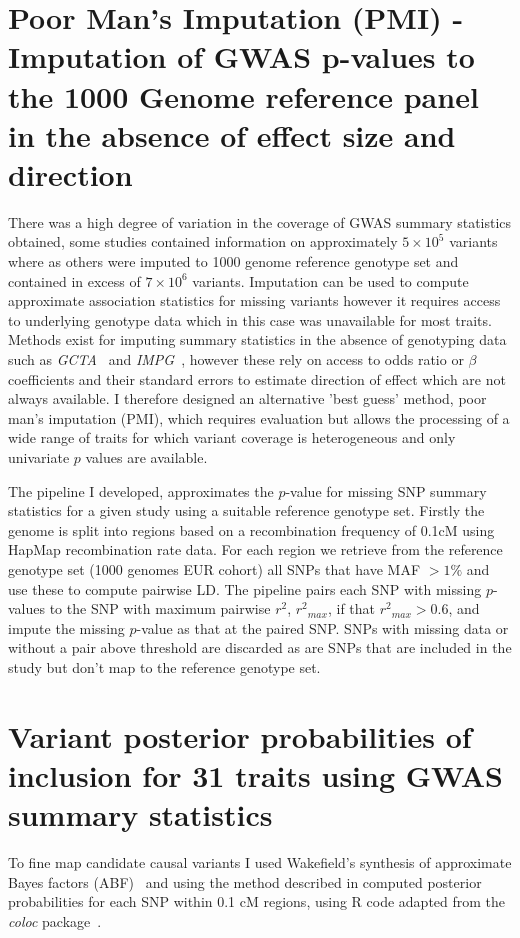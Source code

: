 \documentclass[a4paper,11pt]{report}
\begin{document}
\section{Poor Man's Imputation (PMI) - Imputation of GWAS p-values to the 1000 Genome reference panel in the absence of effect size and direction}
There was a high degree of variation in the coverage of GWAS summary statistics obtained, some studies contained information on approximately $5 \times 10^5$ variants where as others were imputed to 1000 genome reference genotype set and contained in excess of $7 \times 10^6$ variants. Imputation can be used to compute approximate association statistics for missing variants however it requires access to underlying genotype data which in this case was unavailable for most traits. Methods exist for imputing summary statistics in the absence of genotyping data such as \textit{GCTA}~\citep{YangLeeGoddardEtAl2011} and \textit{IMPG}~\citep{Pasaniuc2014-im}, however these rely on access to odds ratio or $\beta$ coefficients and their standard errors to estimate direction of effect which are not always available. I therefore designed an alternative 'best guess' method, poor man's imputation (PMI), which requires evaluation but allows the processing of a wide range of traits for which variant coverage is heterogeneous and only univariate $p$ values are available.

The pipeline I developed, approximates the $p$-value for missing SNP summary statistics for a given study using a suitable reference genotype set. Firstly the genome is split into regions based on a recombination frequency of 0.1cM using HapMap recombination rate data. For each region we retrieve from the reference genotype set (1000 genomes EUR cohort) all SNPs that have MAF $ > 1\%$ and use these to compute pairwise LD. The pipeline pairs each SNP with missing $p$-values to the SNP with maximum pairwise $r^2$, ${r^2}_{max}$, if that ${r^2}_{max} > 0.6$, and impute the missing $p$-value as that at the paired SNP. SNPs with missing data or without a pair above threshold are discarded as are SNPs that are included in the study but don’t map to the reference genotype set. 

\section{Variant posterior probabilities of inclusion for 31 traits using GWAS summary statistics}
To fine map candidate causal variants I used Wakefield’s synthesis of approximate Bayes factors (ABF)~\citep{Wakefield2009} and using the method described in \citet{The_Wellcome_Trust_Case_Control_Consortium2012-ad} computed posterior probabilities for each SNP within 0.1 cM regions, using R code adapted from the \textit{coloc} package~\citep{GiambartolomeiVukcevicSchadtEtAl2014}.  
\end{document}
